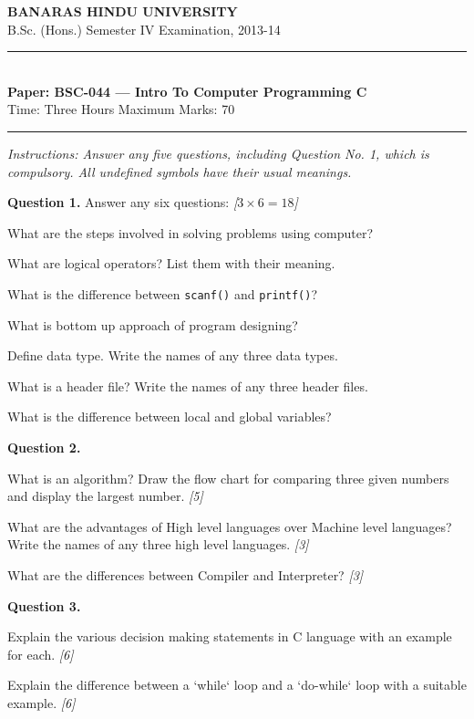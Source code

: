 \documentclass[11pt,a4paper]{article}
\newcommand{\pts}[1]{\hfill\textit{[#1]}}
\begin{document}
\begin{center}
  {\large\bfseries BANARAS HINDU UNIVERSITY}\\[2pt]
  {\normalsize B.Sc. (Hons.) Semester IV Examination, 2013-14}\\[6pt]
  \rule{0.8\linewidth}{0.5pt}\\[6pt]
  {\large\bfseries Paper: BSC-044 --- Intro To Computer Programming C}\\[4pt]
  {\normalsize Time: Three Hours \hfill Maximum Marks: 70}
\end{center}

\rule{\linewidth}{0.4pt}

\smallskip
\noindent\textit{Instructions: Answer any five questions, including Question No. 1, which is compulsory. All undefined symbols have their usual meanings.}

\bigskip

\medskip\noindent\textbf{Question 1.} Answer any six questions: \pts{$3\times6=18$}
\begin{parts}
  \item What are the steps involved in solving problems using computer?
  \item What are logical operators? List them with their meaning.
  \item What is the difference between \texttt{scanf()} and \texttt{printf()}?
  \item What is bottom up approach of program designing?
  \item Define data type. Write the names of any three data types.
  \item What is a header file? Write the names of any three header files.
  \item What is the difference between local and global variables?
\end{parts}

\medskip\noindent\textbf{Question 2.}
\begin{parts}
  \item What is an algorithm? Draw the flow chart for comparing three given numbers and display the largest number. \pts{5}
  \item What are the advantages of High level languages over Machine level languages? Write the names of any three high level languages. \pts{3}
  \item What are the differences between Compiler and Interpreter? \pts{3}
\end{parts}

\medskip\noindent\textbf{Question 3.}
\begin{parts}
  \item Explain the various decision making statements in C language with an example for each. \pts{6}
  \item Explain the difference between a `while` loop and a `do-while` loop with a suitable example. \pts{6}
\end{parts}
\end{document}

